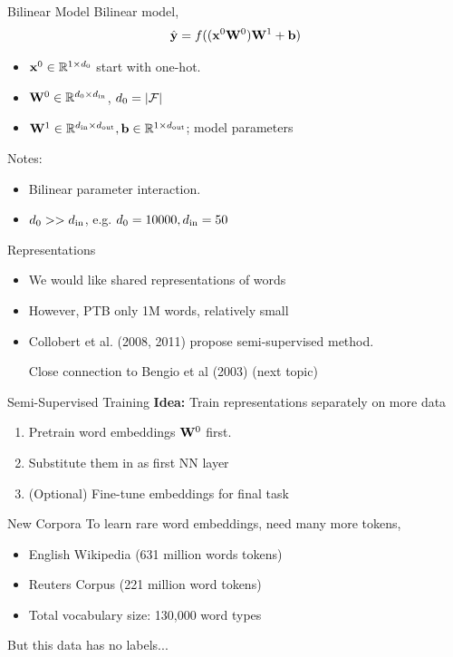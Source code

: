 \documentclass{beamer}
\begin{document}
\begin{frame}{Bilinear Model}
  Bilinear model,
  \[\hat{\mathbf{y}} = f((\mathbf{x}^0 \mathbf{W}^0)\mathbf{W}^1 + \mathbf{b})\]
  \begin{itemize}
  \item $\mathbf{x}^0 \in \mathbb{R}^{1 \times d_0}$ start with one-hot.
  \item $\mathbf{W}^0 \in \mathbb{R}^{d_0 \times {d_{\mathrm{in}}}}$, $d_0 = |\mathcal{F}|$
  \item $\mathbf{W}^1 \in \mathbb{R}^{{d_{\mathrm{in}}} \times {d_{\mathrm{out}}}}, \mathbf{b} \in \mathbb{R}^{1 \times {d_{\mathrm{out}}}}$; model parameters
  \end{itemize}
  \air
  Notes:
  \begin{itemize}
  \item Bilinear parameter interaction.
  \item $d_0 >> {d_{\mathrm{in}}}$, e.g. $d_0 = 10000, {d_{\mathrm{in}}} = 50$
  \end{itemize}
\end{frame}

\begin{frame}{Representations}
  \begin{itemize}
  \item We would like shared representations of words
    \air

  \item However, PTB only 1M words, relatively small

    \air
  \item Collobert et al. (2008, 2011) propose semi-supervised method.

    \air
  \item [Close connection to Bengio et al (2003) (next topic)]
  \end{itemize}
\end{frame}

\begin{frame}{Semi-Supervised Training }
  \textbf{Idea:} Train representations separately on more data

  \begin{enumerate}
  \item Pretrain word embeddings $\mathbf{W}^0$ first.
  \item Substitute them in as first NN layer
  \item (Optional) Fine-tune embeddings for final task
  \end{enumerate}
\end{frame}

\begin{frame}{New Corpora}
  To learn rare word embeddings, need many more tokens,

  \begin{itemize}
  \item English Wikipedia (631 million words tokens)
    \air
  \item Reuters Corpus (221 million word tokens)
    \air
  \item Total vocabulary size: 130,000 word types
  \end{itemize}

  But this data has no labels...
\end{frame}
\end{document}
